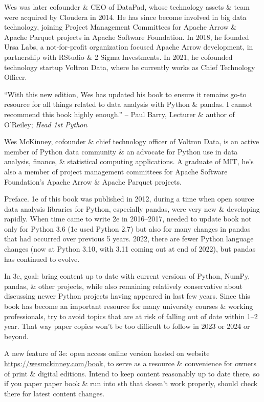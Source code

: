 \documentclass{article}
\begin{document}
\begin{enumerate}
	{\sc Wes} was later cofounder \& CEO of DataPad, whose technology assets \& team were acquired by Cloudera in 2014. He has since become involved in big data technology, joining Project Management Committees for Apache Arrow \& Apache Parquet projects in Apache Software Foundation. In 2018, he founded Ursa Labs, a not-for-profit organization focused Apache Arrow development, in partnership with RStudio \& 2 Sigma Investments. In 2021, he cofounded technology startup Voltron Data, where he currently works as Chief Technology Officer.
	
	``With this new edition, {\sc Wes} has updated his book to ensure it remains go-to resource for all things related to data analysis with Python \& pandas. I cannot recommend this book highly enough.'' -- {\sc Paul Barry}, Lecturer \& author of O'Reiley; {\it Head 1st Python}
	
	{\sc Wes McKinney}, cofounder \& chief technology officer of Voltron Data, is an active member of Python data community \& an advocate for Python use in data analysis, finance, \& statistical computing applications. A graduate of MIT, he's also a member of project management committees for Apache Software Foundation's Apache Arrow \& Apache Parquet projects.
	
	{\sf Preface.} 1e of this book was published in 2012, during a time when open source data analysis libraries for Python, especially pandas, were very new \& developing rapidly. When time came to write 2e in 2016--2017, needed to update book not only for Python 3.6 (1e used Python 2.7) but also for many changes in pandas that had occurred over previous 5 years. 2022, there are fewer Python language changes (now at Python 3.10, with 3.11 coming out at end of 2022), but pandas has continued to evolve.
	
	In 3e, goal: bring content up to date with current versions of Python, NumPy, pandas, \& other projects, while also remaining relatively conservative about discussing newer Python projects having appeared in last few years. Since this book has become an important resource for many university courses \& working professionals, try to avoid topics that are at risk of falling out of date within 1--2 year. That way paper copies won't be too difficult to follow in 2023 or 2024 or beyond.
	
	A new feature of 3e: open access online version hosted on website \url{https://wesmckinney.com/book}, to serve as a resource \& convenience for owners of print \& digital editions. Intend to keep content reasonably up to date there, so if you paper paper book \& run into sth that doesn't work properly, should check there for latest content changes.
	

\end{enumerate}
\end{document}

